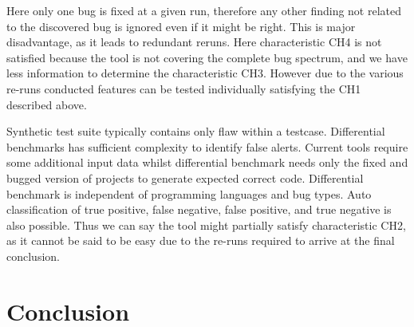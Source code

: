 \documentclass[authoryear,preprint]{sigplanconf}
\begin{document}
Here only one bug is fixed at a given run, therefore any other finding not related to the discovered bug is ignored even if it might be right. This is major disadvantage, as it leads to redundant reruns. Here characteristic CH4 is not satisfied because the tool is not covering the complete bug spectrum, and we have less information to determine the characteristic CH3. However due to the various re-runs conducted features can be tested individually satisfying the CH1 described above.
\begin{table*}[h]
	\centering
	\captionsetup{justification=centering}
	\caption{Characteristics available within each approach}
	\label{my-label}
\end{table*}

Synthetic test suite typically contains only flaw within a testcase. Differential benchmarks has sufficient complexity to identify false alerts. Current tools require some additional input data whilst differential benchmark needs only the fixed and bugged version of projects to generate expected correct code. Differential benchmark is independent of programming languages and bug types. Auto classification of true positive, false negative, false positive, and true negative is also possible. Thus we can say the tool might partially satisfy characteristic CH2, as it cannot be said to be easy due to the re-runs required to arrive at the final conclusion.

\section{Conclusion}

		
	
	
	
	
\end{document}

